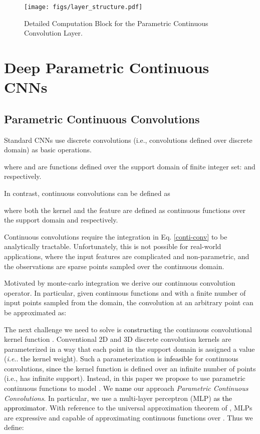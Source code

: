 \documentclass[10pt,twocolumn,letterpaper]{article}
\makeatletter
\newcommand\simon[1]{\textcolor{black}{#1}}
\def\@onedot{\ifx\@let@token.\else.\null\fi\xspace}
\DeclareRobustCommand\onedot{\futurelet\@let@token\@onedot}
\def\ie{\emph{i.e}\onedot} \def\Ie{\emph{I.e}\onedot}
\makeatother
\begin{document}
\begin{figure*}
  \centering
  \texttt{[image: figs/layer\_structure.pdf]}
  \vspace{-3mm}
  \caption{Detailed Computation Block for the Parametric Continuous Convolution Layer.} 
  \label{fig:layer}
\end{figure*}

\section{Deep Parametric Continuous CNNs}

\subsection{Parametric Continuous Convolutions}


Standard CNNs  use discrete convolutions (i.e., convolutions defined over discrete domain) as basic operations. 
 
where  and  are functions defined over the support domain of finite integer set:  and  respectively. 

In contrast, continuous convolutions can be defined as 

where both the kernel  and the feature  are defined as continuous functions over the support domain  and  respectively. 

Continuous convolutions  require the integration in Eq. \eqref{conti-conv}  to be analytically tractable.  Unfortunately, this is not  possible for real-world applications, where the input features are complicated and non-parametric, and the observations are sparse points sampled over the continuous domain. 

Motivated by monte-carlo integration \cite{mc} we derive our continuous convolution operator.  
 In particular, given continuous functions  and  with a finite number of input points  sampled from the domain, the convolution at an arbitrary point  can be approximated as: 


The next challenge we need to solve is \simon{constructing} the continuous convolutional kernel function . 
Conventional 2D and 3D discrete convolution kernels are parameterized in a way that each point in the support domain is assigned a value (\ie the kernel weight). Such a parameterization is 
\simon{infeasible} for continuous convolutions, \simon{since} the kernel function  is defined over an infinite number of points (i.e., has infinite support). Instead, in this paper we propose to use parametric continuous functions to model . 
We \simon{name} our approach  {\it Parametric Continuous Convolutions}.
In particular, we use a multi-layer perceptron (MLP) \simon{as the approximator}. With reference to the universal approximation theorem of \cite{mlp-theory}, MLPs are expressive and capable of approximating continuous functions over . Thus we define:
\end{document}
